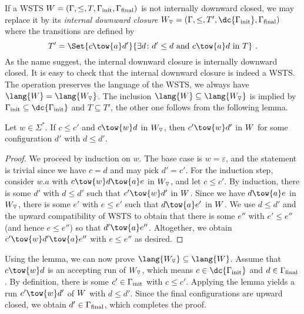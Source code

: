 \documentclass[../../diss.tex]{subfiles}
\begin{document}
If a WSTS $W = (\Gamma,\leq,T,\Gamma_{\text{init}},\Gamma_{\text{final}})$ is not internally downward closed, we may replace it by its \emph{internal downward closure} $\idc{\wsts} = (\configs,\leq,T',\dc{\configs_\init},\configs_\final)$ where the transitions are defined by
\[
    T' = \Set{ c \tow{a} d' }{ \exists d \colon d' \leq d \text{ and } c \tow{a} d \text{ in } T}
    \ .
\]
As the name suggest, the internal downward closure is internally downward closed.
It is easy to check that the internal downward closure is indeed a WSTS.\@
The operation preserves the language of the WSTS, \ie we always have $\lang{\wsts} = \lang{\idc{\wsts}}$.
The inclusion $\lang{\wsts} \subseteq \lang{\idc{\wsts}}$ is implied by $\configs_\init \subseteq \dc{\configs_\init}$ and $T \subseteq T'$, the other one follows from the following lemma.

\begin{lemma}%
\label{Lemma:WSTSExtendedCompatibility}%
    Let $w \in \Sigma^*$.
    If $c \leq c'$ and $c \tow{w} d$ in $W_{\scriptstyle{\triangledown}}$, then $c' \tow{w} d'$ in $W$ for some configuration $d'$ with $d \leq d'$.
\end{lemma}

\begin{proof}
    We proceed by induction on $w$.
    The base case is $w = \varepsilon$, and the statement is trivial since we have $c = d$ and may pick $d' = c'$.
    For the induction step, consider $w.a$ with $c \tow{w} d \tow{a} e$ in $W_{\scriptstyle{\triangledown}}$, and let $c \leq c'$.
    By induction, there is some $d'$ with $d \leq d'$ such that $c' \tow{w} d'$ in $W$.
    Since we have $d \tow{a} e$ in $W_{\scriptstyle{\triangledown}}$, there is some $e'$ with $e \leq e'$ such that $d \tow{a} e'$ in $W$.
    We use $d \leq d'$ and the upward compatibility of WSTS to obtain that there is some $e''$ with $e' \leq e''$ (and hence $e \leq e''$) so that $d' \tow{a} e''$.
    Altogether, we obtain $c' \tow{w} d' \tow{a} e''$ with $e \leq e''$ as desired.
\end{proof}

Using the lemma, we can now prove $\lang{\idc{\wsts}} \subseteq \lang{\wsts}$.
Assume that $c \tow{w} d$ is an accepting run of $W_{\scriptstyle{\triangledown}}$, which means $c \in \dc{\configs_\init}$ and $d \in \Gamma_{\text{final}}$.
By definition, there is some $c' \in \Gamma_{\text{init}}$ with $c \leq c'$.
Applying the lemma yields a run $c' \tow{w} d'$ of $W$ with $d \leq d'$.
Since the final configurations are upward closed, we obtain $d' \in \Gamma_{\text{final}}$, which completes the proof.
\end{document}
